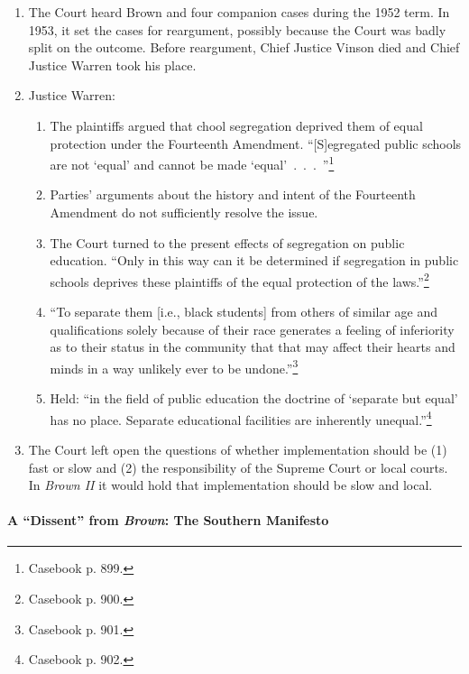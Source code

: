 \begin{enumerate}
    \item The Court heard Brown and four companion cases during the 1952 term. 
    In 1953, it set the cases for reargument, possibly because the Court was 
    badly split on the outcome. Before reargument, Chief Justice Vinson died 
    and Chief Justice Warren took his place.
    \item Justice Warren:
    \begin{enumerate}
        \item The plaintiffs argued that chool segregation deprived them of 
        equal protection under the Fourteenth Amendment. ``[S]egregated public
        schools are not `equal' and cannot be made 
        `equal'~.~.~.~''\footnote{Casebook p. 899.}
        \item Parties' arguments about the history and intent of the 
        Fourteenth Amendment do not sufficiently resolve the issue.
        \item The Court turned to the present effects of segregation on public 
        education. ``Only in this way can it be determined if segregation in 
        public schools deprives these plaintiffs of the equal protection of 
        the laws.''\footnote{Casebook p. 900.}
        \item ``To separate them [i.e., black students] from others of similar 
        age and qualifications solely because of their race generates a 
        feeling of inferiority as to their status in the community that that 
        may affect their hearts and minds in a way unlikely ever to be 
        undone.''\footnote{Casebook p. 901.}
        \item Held: ``in the field of public education the doctrine of 
        `separate but equal' has no place. Separate educational facilities are 
        inherently unequal.''\footnote{Casebook p. 902.}
    \end{enumerate}
    \item The Court left open the questions of whether implementation should 
    be (1) fast or slow and (2) the responsibility of the Supreme Court or 
    local courts. In \emph{Brown II} it would hold that implementation should 
    be slow and local.
\end{enumerate}

\paragraph{A ``Dissent'' from \emph{Brown}: The Southern Manifesto}

